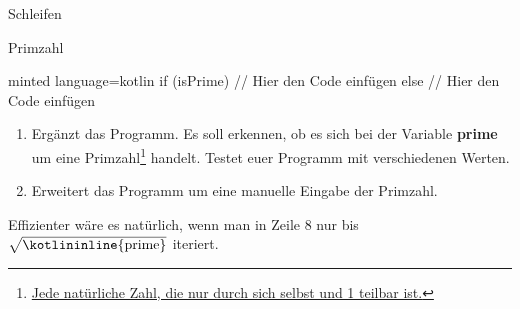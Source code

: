 \begin{task}[points=auto]{Schleifen}
\begin{subtask*}[points=0]{Primzahl }
\begin{codeBlock}[]{minted language=kotlin}
                if (isPrime) {
                    // Hier den Code einfügen
                } else {
                    // Hier den Code einfügen
                }
        \end{codeBlock}
        \begin{enumerate}
            \item Ergänzt das Programm. Es soll erkennen, ob es sich bei der Variable \textbf{prime} um eine Primzahl\footnote{\href{https://de.wikipedia.org/wiki/Primzahl}{Jede natürliche Zahl, die nur durch sich selbst und 1 teilbar ist.}} handelt. Testet euer Programm mit verschiedenen Werten.
            \item Erweitert das Programm um eine manuelle Eingabe der Primzahl.
        \end{enumerate}

        \begin{solution}
            \begin{anmerkung}
                Effizienter wäre es natürlich, wenn man in Zeile 8 nur bis $\sqrt{\text{\kotlininline{prime}}}$ iteriert.
            \end{anmerkung}
        \end{solution}
    \end{subtask*}
\end{task}
